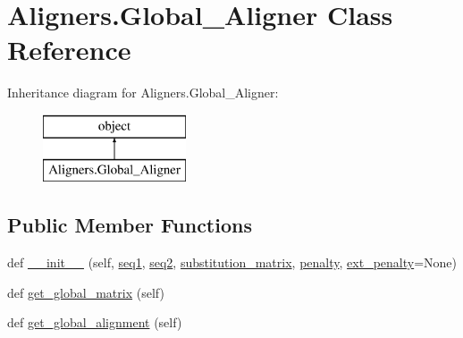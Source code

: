\hypertarget{class_aligners_1_1_global___aligner}{}\section{Aligners.\+Global\+\_\+\+Aligner Class Reference}
\label{class_aligners_1_1_global___aligner}
Inheritance diagram for Aligners.\+Global\+\_\+\+Aligner\+:\begin{figure}[H]
\begin{center}
\leavevmode
\includegraphics[height=2.000000cm]{class_aligners_1_1_global___aligner}
\end{center}
\end{figure}
\subsection*{Public Member Functions}
\begin{DoxyCompactItemize}
\item 
def \hyperlink{class_aligners_1_1_global___aligner_a0ee9494eaed0fec52d8c2c1c95fc646d}{\+\_\+\+\_\+init\+\_\+\+\_\+} (self, \hyperlink{class_aligners_1_1_global___aligner_a04780fa6727d419f44ce9d577b8b651f}{seq1}, \hyperlink{class_aligners_1_1_global___aligner_a19eaae2895d2246e10543689957a0d36}{seq2}, \hyperlink{class_aligners_1_1_global___aligner_a718075378ef694647d0f4c42ecb7adf9}{substitution\+\_\+matrix}, \hyperlink{class_aligners_1_1_global___aligner_a2dccafe7e89339e5b1e7354de601c2cb}{penalty}, \hyperlink{class_aligners_1_1_global___aligner_aa5a4464984be91c2a0407719a1c1a85d}{ext\+\_\+penalty}=None)
\item 
def \hyperlink{class_aligners_1_1_global___aligner_ae3a7749813381c746e7d3245efbfd0de}{get\+\_\+global\+\_\+matrix} (self)
\item 
def \hyperlink{class_aligners_1_1_global___aligner_ae7b1909e0e0262127f767691b20b82e0}{get\+\_\+global\+\_\+alignment} (self)
\end{DoxyCompactItemize}
